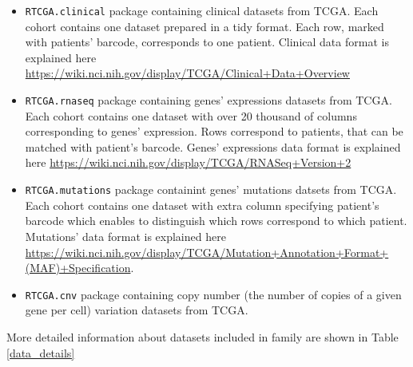 \begin{itemize}
\itemsep1pt\parskip0pt
\item
  \texttt{RTCGA.clinical} package containing clinical datasets from
  TCGA. Each cohort contains one dataset prepared in a tidy format. Each
  row, marked with patients' barcode, corresponds to one patient.
  Clinical data format is explained here
  \url{https://wiki.nci.nih.gov/display/TCGA/Clinical+Data+Overview}
\item
  \texttt{RTCGA.rnaseq} package containing genes' expressions datasets
  from TCGA. Each cohort contains one dataset with over 20 thousand of
  columns corresponding to genes' expression. Rows correspond to
  patients, that can be matched with patient's barcode. Genes'
  expressions data format is explained here
  \url{https://wiki.nci.nih.gov/display/TCGA/RNASeq+Version+2}
\item
  \texttt{RTCGA.mutations} package containint genes' mutations datsets
  from TCGA. Each cohort contains one dataset with extra column
  specifying patient's barcode which enables to distinguish which rows
  correspond to which patient. Mutations' data format is explained here
  \url{https://wiki.nci.nih.gov/display/TCGA/Mutation+Annotation+Format+(MAF)+Specification}.
\item
  \texttt{RTCGA.cnv} package containing copy number (the number of
  copies of a given gene per cell) variation datasets from TCGA.
\end{itemize}

More detailed information about datasets included in 
family are shown in Table \ref{data_details}

\tiny

